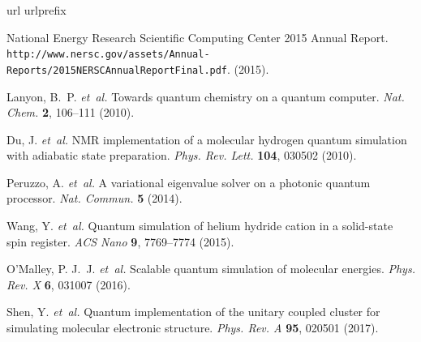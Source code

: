\documentclass[twocolumn]{revtex4-1}
\newcommand{\1}{\mathbbm{1}}
\begin{document}
\begin{thebibliography}{10}
\expandafter\ifx\csname url\endcsname\relax
  \def\url#1{\texttt{#1}}\fi
\expandafter\ifx\csname urlprefix\endcsname\relax\def\urlprefix{URL }\fi
\providecommand{\bibinfo}[2]{#2}
\providecommand{\eprint}[2][]{\url{#2}}

\newblock \bibinfo{title}{National Energy Research Scientific Computing Center 2015 Annual Report}.
\newblock
  \bibinfo{howpublished}{\url{http://www.nersc.gov/assets/Annual-Reports/2015NERSCAnnualReportFinal.pdf}}.
  (\bibinfo{year}{2015}).


\bibinfo{author}{Lanyon, B.~P.} \emph{et~al.}
\newblock \bibinfo{title}{Towards quantum chemistry on a quantum computer}.
\newblock \emph{\bibinfo{journal}{Nat. Chem.}}
  \textbf{\bibinfo{volume}{2}}, \bibinfo{pages}{106--111}
  (\bibinfo{year}{2010}).

\bibinfo{author}{Du, J.} \emph{et~al.}
\newblock \bibinfo{title}{NMR implementation of a molecular hydrogen quantum
  simulation with adiabatic state preparation}.
\newblock \emph{\bibinfo{journal}{Phys. Rev. Lett.}}
  \textbf{\bibinfo{volume}{104}}, \bibinfo{pages}{030502}
  (\bibinfo{year}{2010}).

\bibinfo{author}{Peruzzo, A.} \emph{et~al.}
\newblock \bibinfo{title}{A variational eigenvalue solver on a photonic quantum
  processor}.
\newblock \emph{\bibinfo{journal}{Nat. Commun.}}
  \textbf{\bibinfo{volume}{5}} (\bibinfo{year}{2014}).

\bibinfo{author}{Wang, Y.} \emph{et~al.}
\newblock \bibinfo{title}{Quantum simulation of helium hydride cation in a
  solid-state spin register}.
\newblock \emph{\bibinfo{journal}{ACS Nano}} \textbf{\bibinfo{volume}{9}},
  \bibinfo{pages}{7769--7774} (\bibinfo{year}{2015}).

\bibinfo{author}{O'Malley, P. J.~J.} \emph{et~al.}
\newblock \bibinfo{title}{Scalable quantum simulation of molecular energies}.
\newblock \emph{\bibinfo{journal}{Phys. Rev. X}} \textbf{\bibinfo{volume}{6}},
  \bibinfo{pages}{031007} (\bibinfo{year}{2016}).

\bibinfo{author}{Shen, Y.} \emph{et~al.}
\newblock \bibinfo{title}{Quantum implementation of the unitary coupled cluster
  for simulating molecular electronic structure}.
\newblock \emph{\bibinfo{journal}{Phys. Rev. A}} \textbf{\bibinfo{volume}{95}},
  \bibinfo{pages}{020501} (\bibinfo{year}{2017}).


\end{thebibliography}
\end{document}
